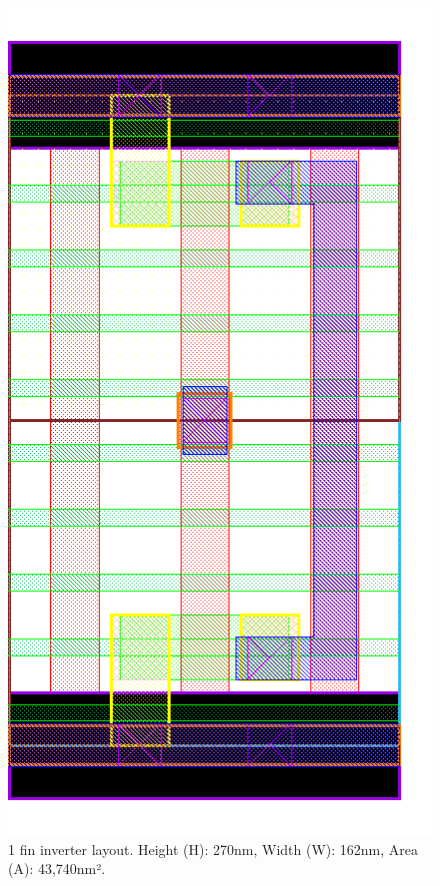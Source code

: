 \documentclass[diss,pgmicro,english]{iiufrgs}
\begin{document}
\begin{figure}[]
\centering
\includegraphics[width=\textwidth,height=\textheight,keepaspectratio]{INV1F.png}
\caption{1 fin inverter layout. Height (H): 270nm, Width (W): 162nm, Area (A): 43,740nm².}
\label{fig:INV1F}
\end{figure}
\end{document}
